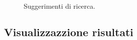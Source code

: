 \begin{figure}[!htb]
	\caption{\label{fig:figura6}} Suggerimenti di ricerca.
\end{figure}

\subsection{Visualizzazzione risultati}